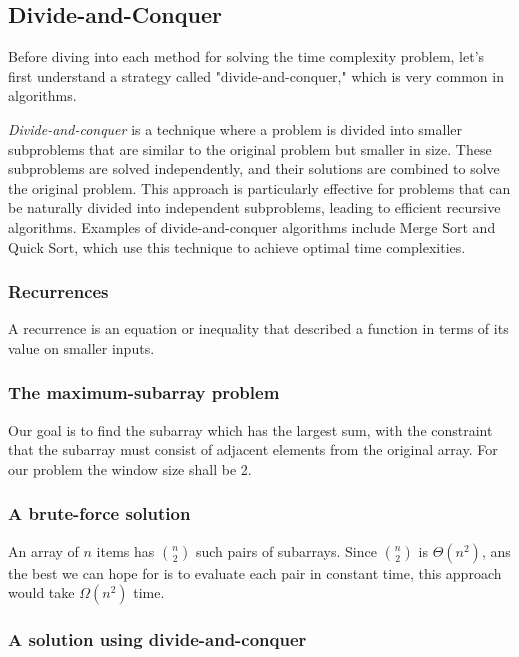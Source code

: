 \documentclass[a4paper,10pt]{article}
\newcommand{\hlt}[1]{\colorbox{color3}{#1}}
\begin{document}
\subsection{Divide-and-Conquer}

Before diving into each method for solving the time complexity problem, let's first understand a strategy called "divide-and-conquer," which is very common in algorithms.

\textit{Divide-and-conquer} is a technique where a problem is divided into smaller subproblems that are similar to the original problem but smaller in size. These subproblems are solved \hlt{independently}, and their solutions are combined to solve the original problem. This approach is particularly effective for problems that can be naturally divided into independent subproblems, leading to efficient recursive algorithms. Examples of divide-and-conquer algorithms include Merge Sort and Quick Sort, which use this technique to achieve optimal time complexities.

\subsubsection{Recurrences}

A recurrence is an equation or inequality that described a function in terms of its value on smaller inputs. 

\subsubsection{The maximum-subarray problem}\label{sec:max_sub_array_1st}

Our goal is to find the subarray which has the largest sum, with the constraint that the subarray must consist of adjacent elements from the original array. For our problem the window size shall be 2. 

\subsubsection{A brute-force solution}

An array of $n$ items has $\binom{n}{2}$ such pairs of subarrays. Since $\binom{n}{2}$ is $\Theta(n^2)$, ans the best we can hope for is to evaluate each pair in constant time, this approach would take $\Omega(n^2)$ time.

\subsubsection{A solution using divide-and-conquer}
\end{document}
